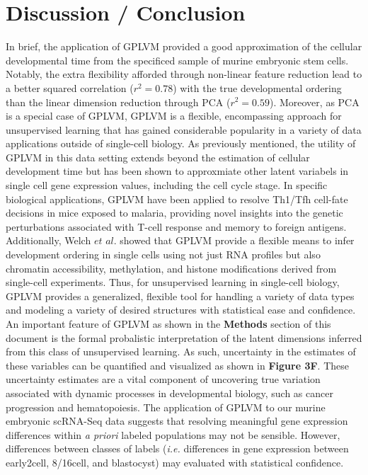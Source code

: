 \documentclass[english, 11pt]{article}\usepackage[]{graphicx}\usepackage[]{color}
\begin{document}
\section{Discussion / Conclusion}

In brief, the application of GPLVM provided a good approximation of the cellular developmental time from the specificed sample of murine embryonic stem cells. Notably, the extra flexibility afforded through non-linear feature reduction lead to a better squared correlation ($r^2 = 0.78$) with the true developmental ordering than the linear dimension reduction through PCA ($r^2 = 0.59$). Moreover, as PCA is a special case of GPLVM, \cite{lawrence2004gaussian} GPLVM is a flexible, encompassing approach for unsupervised learning that has gained considerable popularity in a variety of data applications outside of single-cell biology. 
\newline \newline
As previously mentioned, the utility of GPLVM in this data setting extends beyond the estimation of cellular development time but has been shown to approxmiate other latent variabels in single cell gene expression values, including the cell cycle stage. \cite{buettner2015computational} In specific biological applications, GPLVM have been applied to resolve Th1/Tfh cell-fate decisions in mice exposed to malaria, providing novel insights into the genetic perturbations associated with T-cell response and memory to foreign antigens. \cite{lonnberg2017single} Additionally, Welch $et$ $al.$ showed that GPLVM provide a flexible means to infer development ordering in single cells using not just RNA profiles but also chromatin accessibility, methylation, and histone modifications derived from single-cell experiments. \cite{welch2017manifold} Thus, for unsupervised learning in single-cell biology, GPLVM provides a generalized, flexible tool for handling a variety of data types and modeling a variety of desired structures with statistical ease and confidence.  
\newline \newline
An important feature of GPLVM as shown in the \textbf{Methods} section of this document is the formal probalistic interpretation of the latent dimensions inferred from this class of unsupervised learning. As such, uncertainty in the estimates of these variables can be quantified and visualized as shown in \textbf{Figure 3F}. These uncertainty estimates are a vital component of uncovering true variation associated with dynamic  processes in developmental biology, such as cancer progression \cite{corces2016lineage} and hematopoiesis. \cite{buenrostro2017single} The application of GPLVM to our murine embryonic scRNA-Seq data suggests that resolving meaningful gene expression differences within \textit{a priori} labeled populations may not be sensible. However, differences between classes of labels (\textit{i.e.} differences in gene expression between early2cell, 8/16cell, and blastocyst) may evaluated with statistical confidence. 
\end{document}

